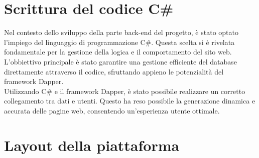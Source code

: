 \section{Scrittura del codice C\#}\label{sec:cap_sec_subsec}
Nel contesto dello sviluppo della parte back-end del progetto, è stato optato l'impiego del linguaggio di programmazione C\#. 
Questa scelta si è rivelata fondamentale per la gestione della logica e il comportamento del sito web. 
L'obbiettivo principale è stato garantire una gestione efficiente del database direttamente attraverso il codice, 
sfruttando appieno le potenzialità del framework Dapper.
\\
Utilizzando C\# e il framework Dapper, è stato possibile realizzare un corretto collegamento tra dati e utenti. 
Questo ha reso possibile la generazione dinamica e accurata delle pagine web, consentendo un'esperienza utente ottimale.
%
\section{Layout della piattaforma}\label{sec:cap_sec_subsec}
